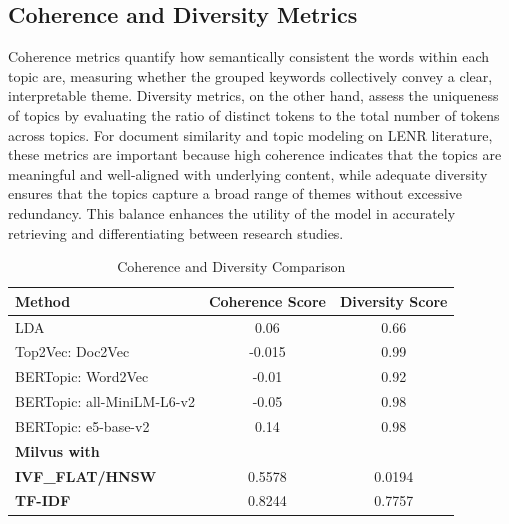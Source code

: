 \documentclass[12pt]{article}
\begin{document}
    \subsection{Coherence and Diversity Metrics}
    Coherence metrics quantify how semantically consistent the words within each topic are, measuring whether the grouped keywords collectively convey a clear, interpretable theme. 
    Diversity metrics, on the other hand, assess the uniqueness of topics by evaluating the ratio of distinct tokens to the total number of tokens across topics. 
    For document similarity and topic modeling on LENR literature, these metrics are important because high coherence indicates that the topics are meaningful and well-aligned with underlying content, while adequate diversity ensures that the topics capture a broad range of themes without excessive redundancy. 
    This balance enhances the utility of the model in accurately retrieving and differentiating between research studies.

    \begin{table}[h!]
        \centering
        \caption{Coherence and Diversity Comparison}
        \label{tab:coherence-diversity}
        \begin{tabular}{|l|c|c|}
            \hline
            \textbf{Method} & \textbf{Coherence Score} & \textbf{Diversity Score} \\ 
            \hline
            LDA                             & 0.06 & 0.66 \\ 
            Top2Vec: Doc2Vec                & -0.015 & 0.99 \\ 
            BERTopic: Word2Vec              & -0.01 & 0.92 \\ 
            BERTopic: all-MiniLM-L6-v2      & -0.05 & 0.98 \\ 
            BERTopic: e5-base-v2            & 0.14 & 0.98 \\ 
            \textbf{Milvus with}            & & \\
            \textbf{IVF\_FLAT/HNSW}         & 0.5578 & 0.0194 \\
            \textbf{TF-IDF}                 & 0.8244 & 0.7757 \\
            \hline
        \end{tabular}
    \end{table}
    
\end{document}
